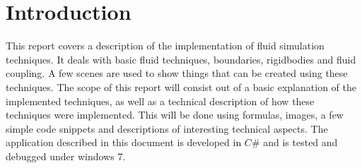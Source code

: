 \chapter{Introduction}

This report covers a description of the implementation of fluid simulation techniques. It deals with basic fluid techniques, boundaries, rigidbodies and fluid coupling. A few scenes are used to show things that can be created using these techniques. The scope of this report will consist out of a basic explanation of the implemented techniques, as well as a technical description of how these techniques were implemented. This will be done using formulas, images, a few simple code snippets and descriptions of interesting technical aspects. The application described in this document is developed in $C\#$ and is tested and debugged under windows 7.